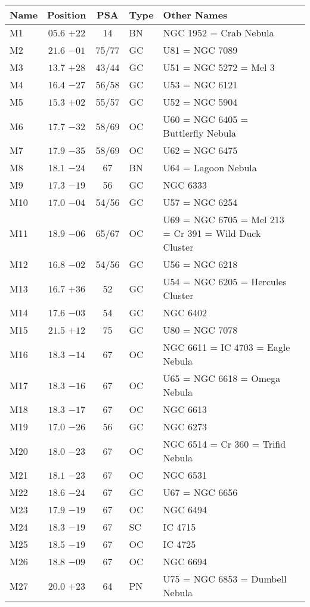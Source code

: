 \begin{table}[t]
\setlength{\tabcolsep}{3pt}
\small
\begin{tabular}{lcclll}
\hline
Name&Position&PSA&Type&Other Names\\
\hline
M1   &$05.6$ $+22$&14&BN &NGC 1952 = Crab Nebula\\
M2   &$21.6$ $-01$&75/77&GC &U81 = NGC 7089\\
M3   &$13.7$ $+28$&43/44&GC &U51 = NGC 5272 = Mel 3\\
M4   &$16.4$ $-27$&56/58&GC &U53 = NGC 6121\\
M5   &$15.3$ $+02$&55/57&GC &U52 = NGC 5904\\
M6   &$17.7$ $-32$&58/69&OC &U60 = NGC 6405 = Buttlerfly Nebula\\
M7   &$17.9$ $-35$&58/69&OC &U62 = NGC 6475\\
M8   &$18.1$ $-24$&67&BN &U64 = Lagoon Nebula\\
M9   &$17.3$ $-19$&56&GC &NGC 6333\\
M10  &$17.0$ $-04$&54/56&GC &U57 = NGC 6254\\
M11  &$18.9$ $-06$&65/67&OC &U69 = NGC 6705 = Mel 213 = Cr 391 = Wild Duck Cluster\\
M12  &$16.8$ $-02$&54/56&GC &U56 = NGC 6218\\
M13  &$16.7$ $+36$&52&GC &U54 = NGC 6205 = Hercules Cluster\\
M14  &$17.6$ $-03$&54&GC &NGC 6402\\
M15  &$21.5$ $+12$&75&GC &U80 = NGC 7078\\
M16  &$18.3$ $-14$&67&OC &NGC 6611 = IC 4703 = Eagle Nebula\\
M17  &$18.3$ $-16$&67&OC &U65 = NGC 6618 = Omega Nebula\\
M18  &$18.3$ $-17$&67&OC &NGC 6613\\
M19  &$17.0$ $-26$&56&GC &NGC 6273\\
M20  &$18.0$ $-23$&67&OC &NGC 6514 = Cr 360 = Trifid Nebula\\
M21  &$18.1$ $-23$&67&OC &NGC 6531\\
M22  &$18.6$ $-24$&67&GC &U67 = NGC 6656\\
M23  &$17.9$ $-19$&67&OC &NGC 6494\\
M24  &$18.3$ $-19$&67&SC &IC 4715\\
M25  &$18.5$ $-19$&67&OC &IC 4725\\
M26  &$18.8$ $-09$&67&OC &NGC 6694\\
M27  &$20.0$ $+23$&64&PN &U75 = NGC 6853 = Dumbell Nebula\\

\end{tabular}
\end{table}
